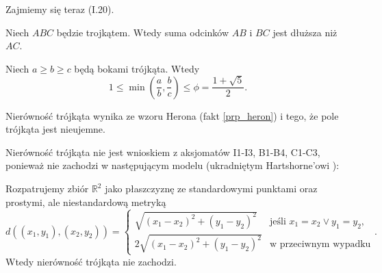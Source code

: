 %

Zajmiemy się teraz (I.20).

\begin{proposition}
%
	Niech $ABC$ będzie trojkątem.
	Wtedy suma odcinków $AB$ i $BC$ jest dłuższa niż $AC$.
\end{proposition}

\begin{corollary}
	Niech $a \ge b \ge c$ będą bokami trójkąta.
	Wtedy
	\begin{equation}
		1 \le \min \left(\frac ab, \frac bc\right) \le \phi = \frac {1 + \sqrt 5}{2}.
	\end{equation}
\end{corollary}

\begin{proposition}
	Nierówność trójkąta wynika ze wzoru Herona (fakt \ref{prp_heron}) i tego, że pole trójkąta jest nieujemne.
\end{proposition}

Nierówność trójkąta nie jest wnioskiem z aksjomatów I1-I3, B1-B4, C1-C3, ponieważ nie zachodzi w następującym modelu (ukradniętym Hartshorne'owi \cite[s. 90]{hartshorne2000}):

\begin{example}
	Rozpatrujemy zbiór $\mathbb R^2$ jako płaszczyznę ze standardowymi punktami oraz prostymi, ale niestandardową metryką
	\begin{equation}
		d((x_1, y_1), (x_2, y_2)) = \begin{cases}
			\sqrt{(x_1-x_2)^2 + (y_1-y_2)^2} & \text{jeśli } x_1 = x_2 \vee y_1 = y_2, \\
			2 \sqrt{(x_1-x_2)^2 + (y_1-y_2)^2} & \text{w przeciwnym wypadku}
		\end{cases}.
	\end{equation}
	Wtedy nierówność trójkąta nie zachodzi.
\end{example}

%